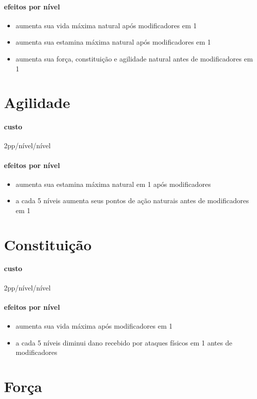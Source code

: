 \paragraph{efeitos por nível}
\begin{itemize}
  \item aumenta sua vida máxima natural após modificadores em 1
  \item aumenta sua estamina máxima natural após modificadores em 1
  \item aumenta sua força, constituição e agilidade natural antes de modificadores em 1
\end{itemize}
%
%
\section{Agilidade}
\paragraph{custo} 2pp/nível/nível
\paragraph{efeitos por nível}
\begin{itemize}
  \item aumenta sua estamina máxima natural em 1 após modificadores
  \item a cada 5 níveis aumenta seus pontos de ação naturais antes de modificadores em 1
\end{itemize}
%
%
\section{Constituição}
\paragraph{custo} 2pp/nível/nível
\paragraph{efeitos por nível}
\begin{itemize}
  \item aumenta sua vida máxima após modificadores em 1
  \item a cada 5 níveis diminui dano recebido por ataques físicos em 1 antes de modificadores
\end{itemize}
%
%
\section{Força}
